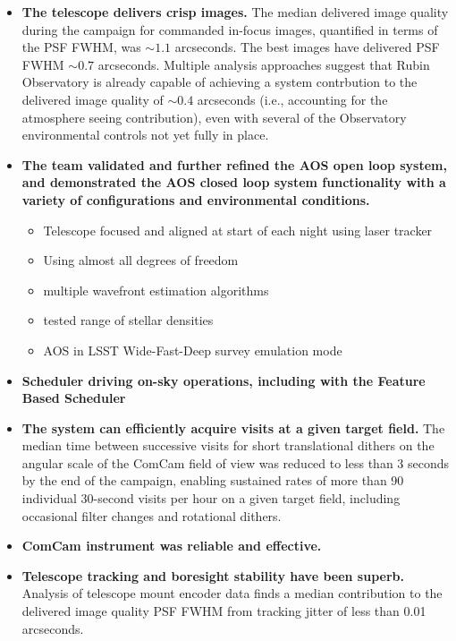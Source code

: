 \begin{itemize}
    \item \textbf{The telescope delivers crisp images.}
    The median delivered image quality during the campaign for commanded in-focus images, quantified in terms of the PSF FWHM, was $\sim1.1$ arcseconds.
    The best images have delivered PSF FWHM $\sim0.7$ arcseconds.
    Multiple analysis approaches suggest that Rubin Observatory is already capable of achieving a system contrbution to the delivered image quality of $\sim0.4$ arcseconds (i.e., accounting for the atmosphere seeing contribution), even with several of the Observatory environmental controls not yet fully in place.
    \item \textbf{The team validated and further refined the AOS open loop system, and demonstrated the AOS closed loop system functionality with a variety of configurations and environmental conditions.}
    \begin{itemize}
        \item Telescope focused and aligned at start of each night using laser tracker
        \item Using almost all degrees of freedom
        \item multiple wavefront estimation algorithms
        \item tested range of stellar densities
        \item AOS in LSST Wide-Fast-Deep survey emulation mode
    \end{itemize}
    \item \textbf{Scheduler driving on-sky operations, including with the Feature Based Scheduler}
    \item \textbf{The system can efficiently acquire visits at a given target field.} The median time between successive visits for short translational dithers on the angular scale of the ComCam field of view was reduced to less than 3 seconds by the end of the campaign, enabling sustained rates of more than 90 individual 30-second visits per hour on a given target field, including occasional filter changes and rotational dithers.
    \item \textbf{ComCam instrument was reliable and effective.}
    \item \textbf{Telescope tracking and boresight stability have been superb.} Analysis of telescope mount encoder data finds a median contribution to the delivered image quality PSF FWHM from tracking jitter of less than 0.01 arcseconds.

\end{itemize}
